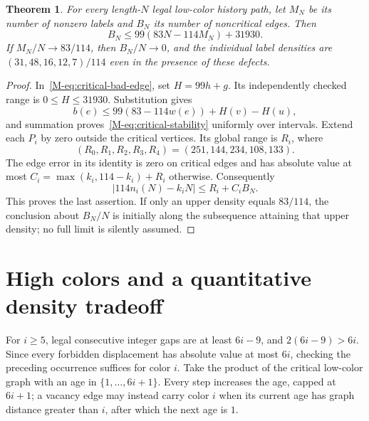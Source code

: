 \documentclass[11pt,reqno]{amsart}
\theoremstyle{plain}
\newtheorem{theorem}{Theorem}
\theoremstyle{plain}
\theoremstyle{plain}
\begin{document}
\begin{theorem}\label{M-thm:critical-stability}
For every length-$N$ legal low-color history path, let $M_N$ be its number
of nonzero labels and $B_N$ its number of noncritical edges. Then
\begin{equation}\label{M-eq:critical-stability}
 B_N\le99(83N-114M_N)+31930.
\end{equation}
If $M_N/N\to83/114$, then $B_N/N\to0$, and the individual label
densities are $(31,48,16,12,7)/114$ even in the presence of these defects.
\end{theorem}
\begin{proof}
In~\eqref{M-eq:critical-bad-edge}, set $H=99h+g$. Its independently checked
range is $0\le H\le31930$. Substitution gives
\[
 b(e)\le99(83-114w(e))+H(v)-H(u),
\]
and summation proves~\eqref{M-eq:critical-stability} uniformly over intervals.
Extend each $P_i$ by zero outside the critical vertices. Its global range
is $R_i$, where
\[
 (R_0,R_1,R_2,R_3,R_4)=(251,144,234,108,133).
\]
The edge error in its identity is zero on critical edges and has absolute
value at most $C_i=\max(k_i,114-k_i)+R_i$ otherwise. Consequently
\[
 |114n_i(N)-k_iN|\le R_i+C_i B_N.
\]
This proves the last assertion. If only an upper density equals $83/114$,
the conclusion about $B_N/N$ is initially along the subsequence attaining
that upper density; no full limit is silently assumed.
\end{proof}


\section{High colors and a quantitative density tradeoff}\label{M-sec:critical-capacity}

For $i\ge5$, legal consecutive integer gaps are at least $6i-9$, and
$2(6i-9)>6i$. Since every forbidden displacement has absolute value at
most $6i$, checking the preceding occurrence suffices for color $i$.
Take the product of the critical low-color graph with an age in
$\{1,\ldots,6i+1\}$. Every step increases the age, capped at $6i+1$;
a vacancy edge may instead carry color $i$ when its current age has
graph distance greater than $i$, after which the next age is $1$.
\end{document}
